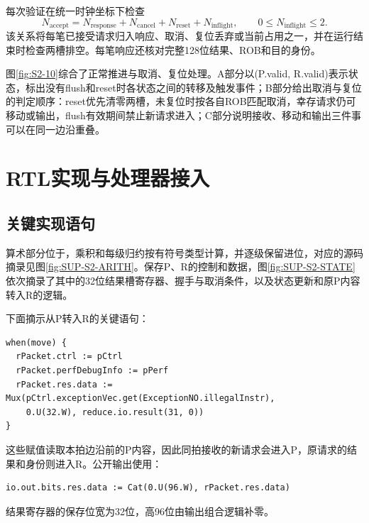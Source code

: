 
每次验证在统一时钟坐标下检查
\[
N_{\mathrm{accept}}=N_{\mathrm{response}}+N_{\mathrm{cancel}}
                  +N_{\mathrm{reset}}+N_{\mathrm{inflight}},
\qquad 0\leq N_{\mathrm{inflight}}\leq2.
\]
该关系将每笔已接受请求归入响应、取消、复位丢弃或当前占用之一，并在运行结束时检查两槽排空。每笔响应还核对完整128位结果、ROB和目的身份。

图\ref{fig:S2-10}综合了正常推进与取消、复位处理。A部分以(P.valid, R.valid)表示状态，标出没有flush和reset时各状态之间的转移及触发事件；B部分给出取消与复位的判定顺序：reset优先清零两槽，未复位时按各自ROB匹配取消，幸存请求仍可移动或输出，flush有效期间禁止新请求进入；C部分说明接收、移动和输出三件事可以在同一边沿重叠。


\section{RTL实现与处理器接入}
\subsection{关键实现语句}
算术部分位于，乘积和每级归约按有符号类型计算，并逐级保留进位，对应的源码摘录见图\ref{fig:SUP-S2-ARITH}。保存P、R的控制和数据，图\ref{fig:SUP-S2-STATE}依次摘录了其中的32位结果槽寄存器、握手与取消条件，以及状态更新和原P内容转入R的逻辑。


下面摘示从P转入R的关键语句：
\begin{Verbatim}[fontsize=\small,breaklines=true]
when(move) {
  rPacket.ctrl := pCtrl
  rPacket.perfDebugInfo := pPerf
  rPacket.res.data := Mux(pCtrl.exceptionVec.get(ExceptionNO.illegalInstr),
    0.U(32.W), reduce.io.result(31, 0))
}
\end{Verbatim}
这些赋值读取本拍边沿前的P内容，因此同拍接收的新请求会进入P，原请求的结果和身份则进入R。公开输出使用：
\begin{Verbatim}[fontsize=\small,breaklines=true]
io.out.bits.res.data := Cat(0.U(96.W), rPacket.res.data)
\end{Verbatim}
结果寄存器的保存位宽为32位，高96位由输出组合逻辑补零。

